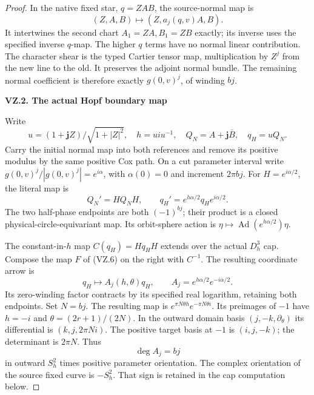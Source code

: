 \begin{proof}
In the native fixed star, \(q=ZAB\), the source-normal map is
\[
 (Z,A,B)\longmapsto(Z,a_j(q,v)A,B).                    \tag{VZ.5}
\]
It intertwines the second chart \(A_1=ZA,B_1=ZB\) exactly; its inverse
uses the specified inverse \(q\)-map. The higher \(q\) terms have no
normal linear contribution. The character shear is the typed Cartier
tensor map, multiplication by \(Z^j\) from the new line to the old.
It preserves the adjoint normal bundle. The remaining normal coefficient
is therefore exactly \(g(0,v)^j\), of winding \(bj\).

\par

\medskip\noindent\textbf{VZ.2. The actual Hopf boundary map}

\par\nobreak

Write
\[
 u=(1+\mathbf jZ)/\sqrt{1+|Z|^2},\quad h=ui u^{-1},\quad
 Q_N=A+\mathbf j\bar B,\quad q_H=uQ_N.
\]
Carry the initial normal map into both references and remove its positive
modulus by the same positive Cox path. On a cut parameter interval write
\(g(0,v)^j/|g(0,v)^j|=e^{i\alpha}\), with \(\alpha(0)=0\) and
increment \(2\pi bj\). For \(H=e^{i\alpha/2}\), the literal map is
\[
 Q_N'=H Q_N H,\qquad
 q_H'=e^{h\alpha/2}q_H e^{i\alpha/2}.                 \tag{VZ.6}
\]
The two half-phase endpoints are both \((-1)^{bj}\); their product is
a closed physical-circle-equivariant map. Its orbit-sphere action is
\(\eta\mapsto\operatorname{Ad}(e^{h\alpha/2})\eta\).

The constant-in-\(h\) map \(C(q_H)=Hq_HH\) extends over the actual
\(D^3_h\) cap. Compose the map \(F\) of (VZ.6) on the right with
\(C^{-1}\). The resulting coordinate arrow is
\[
 q_H\longmapsto A_j(h,\theta)q_H,\qquad
 A_j=e^{h\alpha/2}e^{-i\alpha/2}.                     \tag{VZ.7}
\]
Its zero-winding factor contracts by its specified real logarithm,
retaining both endpoints. Set \(N=bj\). The resulting map is
\(e^{\pi N\theta h}e^{-\pi N\theta i}\). Its preimages of \(-1\)
have \(h=-i\) and \(\theta=(2r+1)/(2N)\). In the outward domain
basis \((j,-k,\partial_\theta)\) its differential is
\((k,j,2\pi Ni)\). The positive target basis at \(-1\) is
\((i,j,-k)\); the determinant is \(2\pi N\). Thus
\[
              \deg A_j=bj                           \tag{VZ.8}
\]
in outward \(S^2_h\) times positive parameter orientation. The complex
orientation of the source fixed curve is \(-S^2_h\). That sign is
retained in the cap computation below.

\par


\end{proof}
